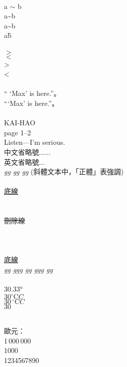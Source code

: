 \documentclass[12pt]{article}
\begin{document}
\begin{CJK*}{UTF8}{bkai}
	\mbox{}\\
	a $\sim$ b  \\
	a\textasciitilde b  \\
	a\~{}b  \\
	a\~b  \\
	
	\mbox{}\\
	$>$ \\
	$<$ \\
	\textgreater \\
	\textless \\
	
	\mbox{}\\	
	`` `Max' is here.''。\\
	``\thinspace`Max' is here.''。\\
	
	\mbox{}\\	
	KAI-HAO\\
	page 1--2\\
	Listen---I'm serious.\\	
	中文省略號......\\
	英文省略號$\ldots$\\
	
	 \emph{gg gg gg} (斜體文本中，「正體」表強調) \\

	\mbox{}\\
	\uline{底線} \\
	 \\
	 \\
	\sout{刪除線} \\
	 \\
	 \\
	 \\
	\uline{底線} \\
	\emph{gg g\emph{gg gg gg}g gg} \\
	
	\mbox{}\\	
	\ang{30.33} \\
	$30^{\circ}\mathrm{C}C$ \\
	$30\,^{\circ}\mathrm{C}C$ \\
	$30\,$\textcelsius \\
	
	\newpage
	
	\mbox{}\\	
	歐元：\texteuro \\
	\mbox{1\,000\,000}\textdollar \\
	\mbox{1000\textperthousand} \\
	\mbox{\num[group-separator={,}]{1234567890}\textdollar}
	

\end{CJK*}
\end{document}
